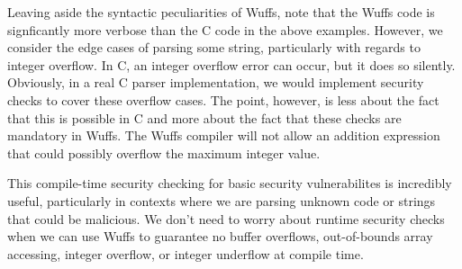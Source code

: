 \documentclass[main.tex]{subfiles}
\begin{document}
Leaving aside the syntactic peculiarities of Wuffs, note that the Wuffs code is
signficantly more verbose than the C code in the above examples. However, we
consider the edge cases of parsing some string, particularly with regards to
integer overflow. In C, an integer overflow error can occur, but it does so
silently. Obviously, in a real C parser implementation, we would implement
security checks to cover these overflow cases. The point, however, is less about
the fact that this is possible in C and more about the fact that these checks
are mandatory in Wuffs. The Wuffs compiler will not allow an addition expression
that could possibly overflow the maximum integer value.

This compile-time security checking for basic security vulnerabilites is
incredibly useful, particularly in contexts where we are parsing unknown code or
strings that could be malicious. We don't need to worry about runtime security
checks when we can use Wuffs to guarantee no buffer overflows, out-of-bounds 
array accessing, integer overflow, or integer underflow at compile time. 
\end{document}
